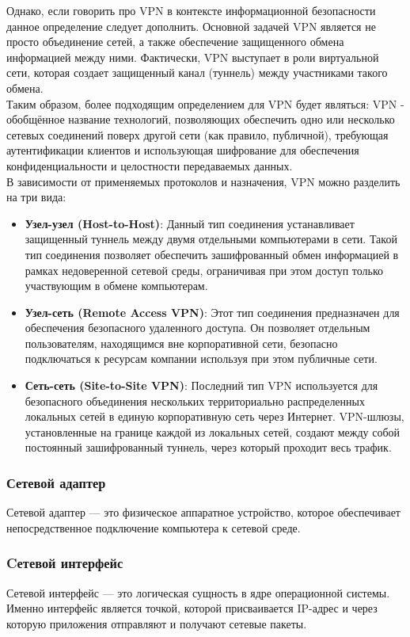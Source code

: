 Однако, если говорить про VPN в контексте информационной безопасности данное определение следует дополнить.
Основной задачей VPN является не просто объединение сетей, а также обеспечение защищенного обмена информацией между ними.
Фактически, VPN выступает в роли виртуальной сети, которая создает защищенный канал (туннель) между участниками такого обмена.\\

Таким образом, более подходящим определением для VPN будет являться:
VPN - обобщённое название технологий, позволяющих обеспечить одно или несколько сетевых соединений поверх другой сети (как правило, публичной), требующая аутентификации клиентов и использующая шифрование для обеспечения конфиденциальности и целостности передаваемых данных.\\

В зависимости от применяемых протоколов и назначения, VPN можно разделить на три вида:
\begin{itemize}
    \item \textbf{Узел-узел (Host-to-Host)}:
    Данный тип соединения устанавливает защищенный туннель между двумя отдельными компьютерами в сети.
    Такой тип соединения позволяет обеспечить зашифрованный обмен информацией в рамках недоверенной сетевой среды, ограничивая при этом доступ только участвующим в обмене компьютерам.
    \item \textbf{Узел-сеть (Remote Access VPN)}:
    Этот тип соединения предназначен для обеспечения безопасного удаленного доступа.
    Он позволяет отдельным пользователям, находящимся вне корпоративной сети, безопасно подключаться к ресурсам компании используя при этом публичные сети.
    \item \textbf{Сеть-сеть (Site-to-Site VPN)}:
    Последний тип VPN используется для безопасного объединения нескольких территориально распределенных локальных сетей в единую корпоративную сеть через Интернет.
    VPN-шлюзы, установленные на границе каждой из локальных сетей, создают между собой постоянный зашифрованный туннель, через который проходит весь трафик.
\end{itemize}

\subsubsection{Сетевой адаптер}
Сетевой адаптер — это физическое аппаратное устройство, которое обеспечивает непосредственное подключение компьютера к сетевой среде.

\subsubsection{Cетевой интерфейс}
Сетевой интерфейс — это логическая сущность в ядре операционной системы. Именно интерфейс является точкой, которой присваивается IP-адрес и через которую приложения отправляют и получают сетевые пакеты.


